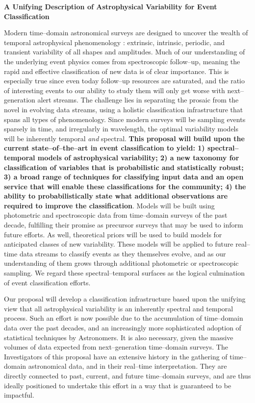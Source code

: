 \centerline{\bf A Unifying Description of Astrophysical Variability for Event
Classification} \medskip

Modern time--domain astronomical surveys are designed to uncover the wealth of
temporal astrophysical phenomenology : extrinsic, intrinsic, periodic, and
transient variability of all shapes and amplitudes.  Much of our understanding
of the underlying event physics comes from spectroscopic follow--up, meaning the
rapid and effective classification of new data is of clear importance. This is
especially true since even today follow--up resources are saturated, and the
ratio of interesting events to our ability to study them will only get worse
with next--generation alert streams. The challenge lies in separating the
prosaic from the novel in evolving data streams, using a holistic classification
infrastructure that spans all types of phenomenology. Since modern surveys will
be sampling events sparsely in time, and irregularly in wavelength, the optimal
variability models will be inherently temporal {\it and} spectral.  {\bf This
proposal will build upon the current state--of--the--art in event classification
to yield: 1) spectral--temporal models of astrophysical variability; 2) a new
taxonomy for classification of variables that is probabilistic and statistically
robust; 3) a broad range of techniques for classifying input data and an open
service that will enable these classifications for the community;  4) the
ability to probabilistically state what additional observations are required to
improve the classification}. Models will be built using photometric and
spectroscopic data from time--domain surveys of the past decade, fulfilling
their promise as precursor surveys that may be used to inform future efforts. As
well, theoretical priors will be used to build models for anticipated classes of
new variability.  These models will be applied to future real--time data streams
to classify events as they themselves evolve, and as our understanding of them
grows through additional photometric or spectroscopic sampling.  We regard these
spectral--temporal surfaces as the logical culmination of event classification
efforts.

\bigskip \centerline{}

Our proposal will develop a classification infrastructure based upon the
unifying view that all astrophysical variability is an inherently spectral and
temporal process.  Such an effort is now possible due to the accumulation of
time--domain data over the past decades, and an increasingly more sophisticated
adoption of statistical techniques by Astronomers. It is also necessary, given
the massive volumes of data expected from next--generation time--domain surveys.
The Investigators of this proposal have an extensive history in the gathering of
time--domain astronomical data, and in their real--time interpretation.  They
are directly connected to past, current, and future time--domain surveys, and
are thus ideally positioned to undertake this effort in a way that is guaranteed
to be impactful.

